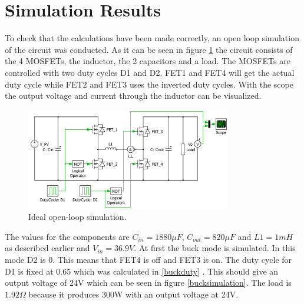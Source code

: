 \section{Simulation Results} \label{opsimresult}

To check that the calculations have been made correctly, an open loop simulation of the circuit was conducted. As it can be seen in figure \ref{fig:openloop_schematic} the circuit consists of the 4 MOSFETs, the inductor, the 2 capacitors and a load. The MOSFETs are controlled with two duty cycles D1 and D2. FET1 and FET4 will get the actual duty cycle while FET2 and FET3 uses the inverted duty cycles. With the scope the output voltage and current through the inductor can be visualized.

\begin{figure}[H]
	\begin{center}
		\includegraphics[width=0.8\textwidth]{../Pictures/P1/Open_loop_simulation/open_loop_schematic}
		\caption{Ideal open-loop simulation.}
		\label{fig:openloop_schematic}
	\end{center}
\end{figure}
The values for the components are $C_{in}=1880\mu F$, $C_{out}=820\mu F$ and $L1=1mH$ as described earlier  and $V_{in}=36.9V$. At first the buck mode is simulated. In this mode D2 is 0. This means that FET4 is off and FET3 is on. The duty cycle for D1 is fixed at 0.65 which was calculated in \ref{buckduty} . This should give an output voltage of 24V which can be seen in figure \ref{bucksimulation}. The load is $1.92\Omega$ because it produces 300W with an output voltage at 24V.     


